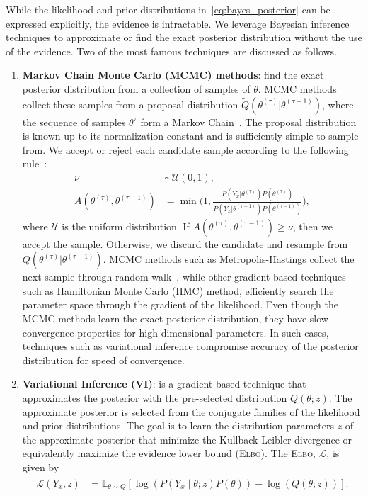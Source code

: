 While the likelihood and prior distributions in~\eqref{eq:bayes_posterior} can
be expressed explicitly, the evidence is intractable. We leverage Bayesian
inference techniques to approximate or find the exact posterior distribution
without the use of the evidence. Two of the most famous techniques are
discussed as follows.
\begin{enumerate}
  \item \textbf{Markov Chain Monte Carlo (MCMC) methods}: find the exact
  posterior distribution from a collection of samples of $\theta$.
  MCMC methods collect these samples from a proposal distribution
  $\tilde{Q}(\theta^{(\tau)} | \theta^{(\tau-1)})$, where the sequence of
  samples $\theta^\tau$ form a Markov Chain~\cite{bishop2006pattern}.
  The proposal distribution is known up to its normalization constant and is
  sufficiently simple to sample from. 
  We accept or reject each candidate sample according to the following rule~\cite{bishop2006pattern}:
  \begin{align*}
    \nu &\sim \mathcal{U}(0, 1), \\
    A(\theta^{(\tau)}, \theta^{(\tau-1)}) &= \min \Biggl(1, \frac{P(Y_x | \theta^{(\tau)})P(\theta^{(\tau)})}{P(Y_x | \theta^{(\tau-1)})P(\theta^{(\tau-1)})} \Biggr),
  \end{align*}
  \noindent where $\mathcal{U}$ is the uniform distribution. If
  $A(\theta^{(\tau)}, \theta^{(\tau-1)}) \geq \nu$, then we accept the sample. 
  Otherwise, we discard the candidate and resample from $\tilde{Q}(\theta^{(\tau)} |
  \theta^{(\tau-1)})$.
  MCMC methods such as Metropolis-Hastings collect the next sample through
  random walk~\cite{gilks1995markov}, while other gradient-based techniques such
  as Hamiltonian Monte Carlo (HMC) method, efficiently search the
  parameter space through the gradient of the likelihood.
  Even though the MCMC methods learn the exact posterior distribution, they have
  slow convergence properties for high-dimensional parameters. In such cases,
  techniques such as variational inference compromise accuracy of the posterior
  distribution for speed of convergence.
  
\item \textbf{Variational Inference (VI)}: is a gradient-based technique that approximates the posterior with the pre-selected
distribution $Q(\theta;z)$.
%
The approximate posterior is selected from the conjugate families of the likelihood and
prior distributions. The goal is to learn the distribution parameters $z$ of the approximate posterior that
minimize the Kullback-Leibler divergence or equivalently maximize the evidence
lower bound (\textsc{Elbo}). The \textsc{Elbo}, $\mathcal{L}$, is given
by~\cite{cohen2016bayesian}
\begin{align}
  \begin{split}
  \mathcal{L}(Y_x,z) &= \mathbb{E}_{\theta \sim Q} \left[\log(P(Y_x \mid \theta;z)P(\theta)) - \log(Q(\theta;z)) \right].
  \end{split}
  \label{eq:elbo}
\end{align}
\end{enumerate}

